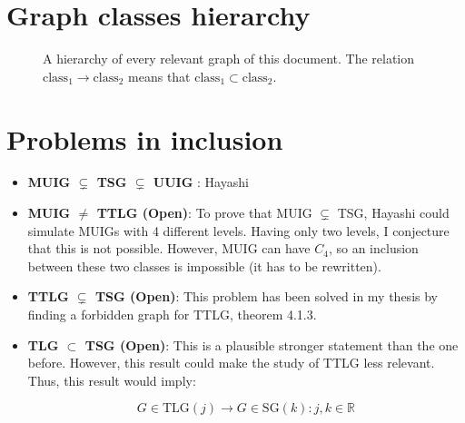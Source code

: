 \begin{appendices}

\chapter{Graph classes hierarchy}

\begin{figure}
\centering

\caption{A hierarchy of every relevant graph of this document. The relation $\text{class}_1 \rightarrow \text{class}_2$ means that $\text{class}_1 \subset \text{class}_2$.}
\label{fig:graph_classes}
\end{figure}

\chapter{Problems in inclusion}
 \begin{itemize}
   \item \textbf{MUIG $\subsetneq$ TSG $\subsetneq$ UUIG }: Hayashi \cite {hayashiThinStripGraphs2017}
   \item \textbf{MUIG $\neq$ TTLG (Open)}: To prove that MUIG $\subsetneq$ TSG, Hayashi \cite{hayashiThinStripGraphs2017} could simulate MUIGs with 4 different levels. Having only two levels, I conjecture that this is not possible. However, MUIG can have $C_4$, so an inclusion between these two classes is impossible (it has to be rewritten).
   \item \textbf{TTLG $\subsetneq$ TSG (Open)}: This problem has been solved in my thesis by finding a forbidden graph for TTLG, theorem 4.1.3.
   \item \textbf{TLG $\subset$ TSG (Open)}: This is a plausible stronger statement than the one before. However, this result could make the study of TTLG less relevant. Thus, this result would imply:

   $$G \in \text{TLG}(j) \to G \in \text{SG}(k) : j,k \in \mathbb{R}$$
 \end{itemize}


\end{appendices}
